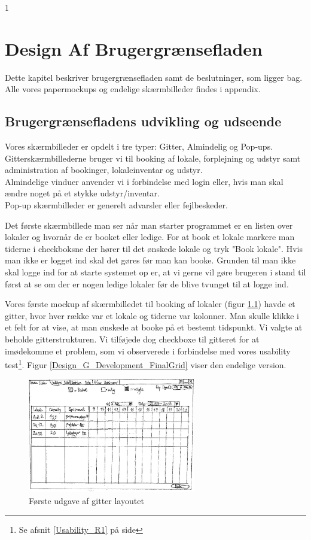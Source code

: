 1\chapter{Design Af Brugergrænsefladen}
\label{Design_G}
Dette kapitel beskriver brugergrænsefladen samt de beslutninger, som ligger bag. Alle vores papermockups og endelige skærmbilleder findes i appendix.

\section{Brugergrænsefladens udvikling og udseende}
\label{Design_G_Development}
Vores skærmbilleder er opdelt i tre typer: Gitter, Almindelig og Pop-ups. 
\\Gitterskærmbillederne bruger vi til booking af lokale, forplejning og udstyr samt administration af bookinger, lokaleinventar og udstyr.
\\Almindelige vinduer anvender vi i forbindelse med login eller, hvis man skal ændre noget på et stykke udstyr/inventar.
\\Pop-up skærmbilleder er generelt advarsler eller fejlbeskeder.

Det første skærmbillede man ser når man starter programmet er en listen over lokaler og hvornår de er booket eller ledige. For at book et lokale markere man tiderne i checkboksne der hører til det ønskede lokale og tryk "Book lokale". Hvis man ikke er logget ind skal det gøres før man kan booke.
Grunden til man ikke skal  logge ind for at starte systemet op er, at vi gerne vil gøre brugeren i stand til først at se om der er nogen ledige lokaler før de blive tvunget til at logge ind.

Vores første mockup af skærmbilledet til booking af lokaler (figur \ref{Design_G_Development_FirstGrid}) havde et gitter, hvor hver række var et lokale og tiderne var kolonner. Man skulle klikke i et felt for at vise, at man ønskede at booke på et bestemt tidspunkt.
Vi valgte at beholde gitterstrukturen. Vi tilføjede dog checkboxe til gitteret for at imødekomme et problem, som vi observerede i forbindelse med vores usability test\footnote{Se afsnit \ref{Usability_R1} på side \pageref{Usability_R1}}. Figur \ref{Design_G_Development_FinalGrid} viser den endelige version.

\begin{figure}[h!]
  \centering
    \includegraphics[angle=90, width=0.65\textwidth]{Appendix/GUI-Prototype/PaperMockup/LokaleListe_001}
  \caption{Første udgave af gitter layoutet}
\label{Design_G_Development_FirstGrid}
\end{figure}

